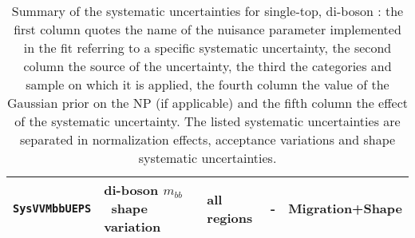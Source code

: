 \begin{table}
{\begin{tabular}{l|llcc}
\texttt{SysVVMbbUEPS} & di-boson $m_{bb}$\ shape variation & all regions & - & Migration+Shape\\
\hline\hline
\end{tabular}
}
\caption[Summary of specific nuisance parameters.]{Summary of the systematic uncertainties for single-top, di-boson : the first column quotes the name of the nuisance parameter implemented in the
fit referring to a specific systematic uncertainty, the second column the source of the uncertainty, the third the categories and sample on which it is applied, the fourth column the value of  the Gaussian prior on
the NP (if applicable) and the fifth column the effect of the systematic uncertainty. The listed systematic uncertainties are separated in normalization effects, acceptance variations  and shape systematic uncertainties.}
{\label{tab:other_systematics}}
\end{table}